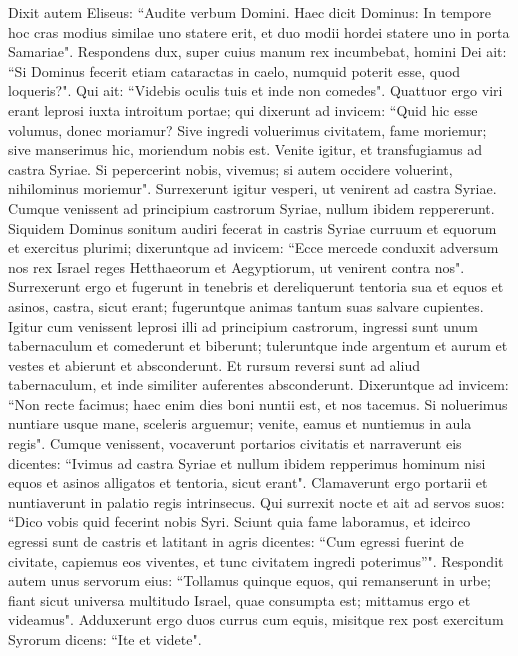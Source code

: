 \begin{biblechapter}  
\verse Dixit autem Eliseus: “Audite verbum Domini. Haec dicit Dominus: In tempore hoc cras modius similae uno statere erit, et duo modii hordei statere uno in porta Samariae". 
\verse Respondens dux, super cuius manum rex incumbebat, homini Dei ait: “Si Dominus fecerit etiam cataractas in caelo, numquid poterit esse, quod loqueris?". Qui ait: “Videbis oculis tuis et inde non comedes". 
\verse Quattuor ergo viri erant leprosi iuxta introitum portae; qui dixerunt ad invicem: “Quid hic esse volumus, donec moriamur? 
\verse Sive ingredi voluerimus civitatem, fame moriemur; sive manserimus hic, moriendum nobis est. Venite igitur, et transfugiamus ad castra Syriae. Si pepercerint nobis, vivemus; si autem occidere voluerint, nihilominus moriemur". 
\verse Surrexerunt igitur vesperi, ut venirent ad castra Syriae. Cumque venissent ad principium castrorum Syriae, nullum ibidem reppererunt. 
\verse Siquidem Dominus sonitum audiri fecerat in castris Syriae curruum et equorum et exercitus plurimi; dixeruntque ad invicem: “Ecce mercede conduxit adversum nos rex Israel reges Hetthaeorum et Aegyptiorum, ut venirent contra nos". 
\verse Surrexerunt ergo et fugerunt in tenebris et dereliquerunt tentoria sua et equos et asinos, castra, sicut erant; fugeruntque animas tantum suas salvare cupientes. 
\verse Igitur cum venissent leprosi illi ad principium castrorum, ingressi sunt unum tabernaculum et comederunt et biberunt; tuleruntque inde argentum et aurum et vestes et abierunt et absconderunt. Et rursum reversi sunt ad aliud tabernaculum, et inde similiter auferentes absconderunt. 
\verse Dixeruntque ad invicem: “Non recte facimus; haec enim dies boni nuntii est, et nos tacemus. Si noluerimus nuntiare usque mane, sceleris arguemur; venite, eamus et nuntiemus in aula regis". 
\verse Cumque venissent, vocaverunt portarios civitatis et narraverunt eis dicentes: “Ivimus ad castra Syriae et nullum ibidem repperimus hominum nisi equos et asinos alligatos et tentoria, sicut erant". 
\verse Clamaverunt ergo portarii et nuntiaverunt in palatio regis intrinsecus.  
\verse Qui surrexit nocte et ait ad servos suos: “Dico vobis quid fecerint nobis Syri. Sciunt quia fame laboramus, et idcirco egressi sunt de castris et latitant in agris dicentes: “Cum egressi fuerint de civitate, capiemus eos viventes, et tunc civitatem ingredi poterimus”". 
\verse Respondit autem unus servorum eius: “Tollamus quinque equos, qui remanserunt in urbe; fiant sicut universa multitudo Israel, quae consumpta est; mittamus ergo et videamus". 
\verse Adduxerunt ergo duos currus cum equis, misitque rex post exercitum Syrorum dicens: “Ite et videte". 

\end{biblechapter}
